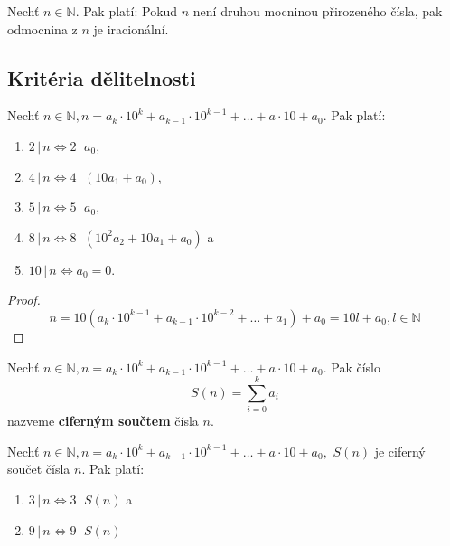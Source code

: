 \begin{veta}
  Nechť $n\in \mathbb N.$ Pak platí: Pokud $n$ není druhou mocninou přirozeného čísla, pak odmocnina z $n$ je iracionální.
\end{veta}

\subsection*{Kritéria dělitelnosti}
\begin{veta}
  Nechť $n\in \mathbb N, n=a_k\cdot 10^k+a_{k-1}\cdot 10^{k-1}+\dots + a\cdot 10 + a_0.$ Pak platí:
  \begin{enumerate}[$i.$]
    \item $2 \, | \, n \iff 2 \, | \, a_0$,
    \item $4 \, | \, n \iff 4 \, | \, (10a_1 + a_0)$,
    \item $5 \, | \, n \iff 5 \, | \, a_0$,
    \item $8 \, | \, n \iff 8 \, | \, (10^2a_2 + 10a_1 + a_0)$ a
    \item $10 \, | \, n \iff a_0 = 0$.
  \end{enumerate}
\end{veta}

\begin{proof}
  $$n = 10(a_k\cdot 10^{k-1}+a_{k-1}\cdot 10 ^{k-2}+\dots+a_1)+a_0 = 10l+a_0, l\in \mathbb N$$ 
\end{proof}

\begin{definition}
  Nechť $n\in \mathbb N, n=a_k\cdot 10^k+a_{k-1}\cdot 10^{k-1}+\dots + a\cdot 10 + a_0.$ Pak číslo
  $$S(n) = \sum_{i=0}^k a_i$$
  nazveme \textbf{ciferným součtem} čísla $n$.
\end{definition}

\begin{veta}
  Nechť $n\in \mathbb N, n=a_k\cdot 10^k+a_{k-1}\cdot 10^{k-1}+\dots + a\cdot 10 + a_0,$ $S(n)$ je ciferný součet čísla $n$. Pak platí:
  \begin{enumerate}[$i.$]
    \item $3\, | \, n \iff 3 \, | \, S(n)$ a
    \item $9\, | \, n \iff 9 \, | \, S(n)$
  \end{enumerate}
\end{veta}

